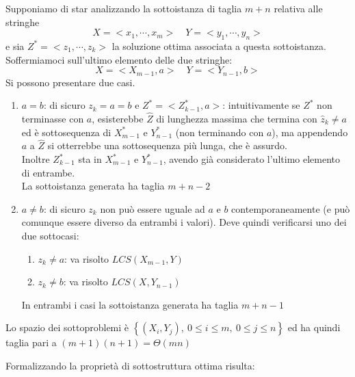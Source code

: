 Supponiamo di star analizzando la sottoistanza di taglia $m+n$ relativa alle stringhe
\[
    X = < x_1, \cdots, x_m > \quad  Y = < y_1, \cdots, y_n >
\]
 e sia
$ Z^* = < z_1, \cdots, z_k > $
la soluzione ottima associata a questa sottoistanza. 
Soffermiamoci sull'ultimo elemento delle due stringhe:
\[
     X = < X_{m-1}, a >  \quad  Y = < Y_{n-1}, b >
\]
Si possono presentare due casi.
\begin{enumerate}
    \item $a=b$: di sicuro $z_k=a=b$ e $ Z^* = < Z_{k-1}^*, a > $: intuitivamente se $Z^*$ non terminasse con $a$, esisterebbe $\hat{Z}$ di lunghezza massima che termina con $\hat{z}_k \neq a$ ed è sottosequenza di $X_{m-1}^*$ e $Y_{n-1}^*$ (non terminando con $a$), ma appendendo $a$ a $\hat{Z}$ si otterrebbe una sottosequenza più lunga, che è assurdo.
        \\
        Inoltre $Z_{k-1}^*$ sta in $X_{m-1}^*$ e $Y_{n-1}^*$, avendo già considerato l'ultimo elemento di entrambe.
        \\
        La sottoistanza generata ha taglia $m+n-2$
    \item $a \neq b$: di sicuro $z_k$ non può essere uguale ad $a$ e $b$ contemporaneamente (e può comunque essere diverso da entrambi i valori). Deve quindi verificarsi uno dei due sottocasi:
        \begin{enumerate}[label=(\roman*)]
            \item $z_k \neq a$: va risolto $LCS\left( X_{m-1}, Y \right)$
            \item $z_k \neq b$: va risolto $LCS\left( X, Y_{n-1} \right)$
        \end{enumerate}
        In entrambi i casi la sottoistanza generata ha taglia $m+n-1$
\end{enumerate}

Lo spazio dei sottoproblemi è $\left\{ \left( X_i, Y_j \right), \: 0 \leq i \leq m, \: 0 \leq j \leq n \right\}$ ed ha quindi taglia pari a $(m+1)(n+1) = \Theta (mn)$

Formalizzando la proprietà di sottostruttura ottima risulta:

